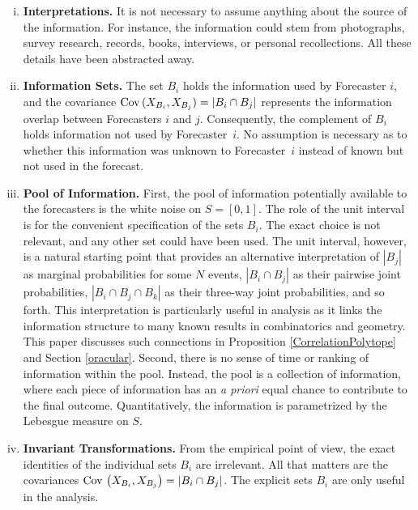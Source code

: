 \documentclass[11pt]{article}
\theoremstyle{definition}
\theoremstyle{definition}
\def\Cov{{\rm Cov}\,}
\begin{document}
\begin{enumerate}[(i)]
\item {\bf Interpretations.} It is not necessary to assume anything 
about the source of the information.  For instance, the information 
could stem from photographs, survey research, records, books, 
interviews, or personal recollections.  All these details have 
been abstracted away.

\item {\bf Information Sets.} The set $B_i$ holds the information used
by Forecaster $i$, and the covariance $\Cov (X_{B_i} , X_{B_j}) = |B_{i} \cap B_{j}|$
represents the information overlap between Forecasters $i$ and
$j$.
Consequently, the complement of $B_i$ holds information not used by
Forecaster~$i$.  No assumption is necessary as to whether this
information was unknown to Forecaster~$i$ instead of known but not
used in the forecast.


\item {\bf Pool of Information.} First, the pool of
information potentially available to the forecasters is the white
noise on $S = [0,1]$. The role of the unit interval
is for the convenient specification of the sets $B_i$.
The exact choice is not relevant, and
any other set could have been used. The unit interval, however, is a
natural starting point that provides an alternative interpretation of $|B_j|$ as marginal probabilities for some $N$ events, $|B_i \cap B_j|$ as their pairwise joint probabilities, $|B_i \cap B_j
\cap B_k|$ as their three-way joint probabilities,
and so forth.  This interpretation is particularly useful in analysis as it links the
information structure to many known results in combinatorics and geometry. This paper discusses such connections in Proposition \ref{CorrelationPolytope} and Section \ref{oracular}. Second, there is
no sense of time or ranking of information within the
pool. Instead, the pool is a collection of information, where each
piece of information has an {\em a priori} equal chance to contribute
to the final outcome.  Quantitatively, the information is parametrized
by the Lebesgue measure on $S$.
\label{item:pool}


\item {\bf Invariant Transformations.}  From the empirical point of
view, the exact identities of the individual sets $B_i$ are
irrelevant.  All that matters are the covariances $\Cov \left(X_{B_i}
, X_{B_j}\right) = |B_i \cap B_j|$.  The explicit sets $B_i$ are only useful in the analysis.


\end{enumerate}
\end{document}
